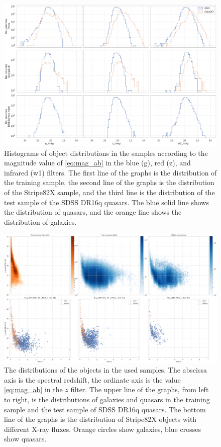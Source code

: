 \documentclass[fleqn,usenatbib]{mnras}
\begin{document}
\begin{figure}
    \centering
    \includegraphics[width=0.9\linewidth]{images/data-dist-mags-ab.png}
    \caption{Histograms of object distributions in the samples according to the magnitude value of \eqref{eq:mag_ab} in the blue (g), red (z), and infrared (w1) filters. The first line of the graphs is the distribution of the training sample, the second line of the graphs is the distribution of the Stripe82X sample, and the third line is the distribution of the test sample of the SDSS DR16q quasars. The blue solid line shows the distribution of quasars, and the orange line shows the distribution of galaxies.}
    \label{fig:data-dist-mags-ab}
\end{figure}

\begin{figure}
    \centering
    \includegraphics[width=0.95\linewidth]{images/data-dist-ab-upsidedown.png}
    \caption{The distributions of the objects in the used samples. The abscissa axis is the spectral redshift, the ordinate axis is the value \eqref{eq:mag_ab} in the $z$ filter. The upper line of the graphs, from left to right, is the distributions of galaxies and quasars in the training sample and the test sample of SDSS DR16q quasars.  The bottom line of the graphs is the distribution of Stripe82X objects with different X-ray fluxes. Orange circles show galaxies, blue crosses show quasars.}
    \label{fig:data_distribution}
\end{figure}
\end{document}
